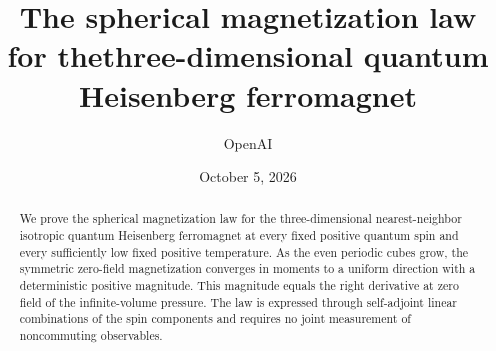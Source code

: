\documentclass[11pt]{article}
\title{The spherical magnetization law for the\linebreak three-dimensional quantum Heisenberg ferromagnet}
\author{OpenAI}
\date{October 5, 2026}
\numberwithin{equation}{section}
\theoremstyle{definition}
\theoremstyle{remark}
\newcommand{\1}{\mathbf1}
\begin{document}
\maketitle
\begin{abstract}
We prove the spherical magnetization law for the three-dimensional
nearest-neighbor isotropic quantum Heisenberg ferromagnet at every fixed
positive quantum spin and every sufficiently low fixed positive
temperature. As the even periodic cubes grow, the symmetric zero-field
magnetization converges in moments to a uniform direction with a
deterministic positive magnitude. This magnitude equals the right
derivative at zero field of the infinite-volume pressure. The law is
expressed through self-adjoint linear combinations of the spin components
and requires no joint measurement of noncommuting observables.
\end{abstract}
\tableofcontents










\end{document}
